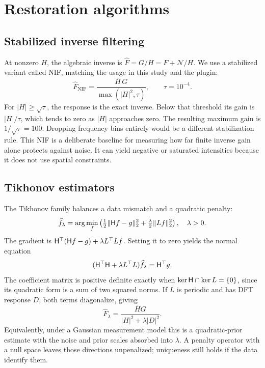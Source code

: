 \section{Restoration algorithms}
\label{sec:algorithms}

\subsection{Stabilized inverse filtering}

At nonzero \(H\), the algebraic inverse is \(\widehat F=G/H=F+\mathcal N/H\). We use a stabilized variant called NIF, matching the usage in this study and the plugin:
\begin{equation}
\widehat F_{\mathrm{NIF}} =
\frac{\overline H\,G}{\max(|H|^2,\tau)},\qquad \tau=10^{-4}.
\label{eq:nif}
\end{equation}
For \(|H|\ge\sqrt{\tau}\), the response is the exact inverse. Below that threshold its gain is \(|H|/\tau\), which tends to zero as \(|H|\) approaches zero. The resulting maximum gain is \(1/\sqrt{\tau}=100\). Dropping frequency bins entirely would be a different stabilization rule. This NIF is a deliberate baseline for measuring how far finite inverse gain alone protects against noise. It can yield negative or saturated intensities because it does not use spatial constraints.

\subsection{Tikhonov estimators}

The Tikhonov family balances a data mismatch and a quadratic penalty:
\begin{equation}
\widehat f_\lambda=
\arg\min_f\left(
\tfrac12\lVert\mathsf H f-g\rVert_2^2+\tfrac{\lambda}{2}\lVert Lf\rVert_2^2
\right),\quad \lambda>0 .
\label{eq:tik-objective}
\end{equation}
The gradient is
\(\mathsf H^\top(\mathsf H f-g)+\lambda L^\top Lf\).
Setting it to zero yields the normal equation
\begin{equation}
(\mathsf H^\top\mathsf H+\lambda L^\top L)\widehat f_\lambda
=\mathsf H^\top g .
\end{equation}
The coefficient matrix is positive definite exactly when
\(\ker\mathsf H\cap\ker L=\{0\}\), since its quadratic form is a sum of two squared norms. If \(L\) is periodic and has DFT response \(D\), both terms diagonalize, giving
\begin{equation}
\widehat F_\lambda=\frac{\overline H G}{|H|^2+\lambda |D|^2}.
\label{eq:tikhonov}
\end{equation}
Equivalently, under a Gaussian measurement model this is a quadratic-prior estimate with the noise and prior scales absorbed into \(\lambda\). A penalty operator with a null space leaves those directions unpenalized; uniqueness still holds if the data identify them.


